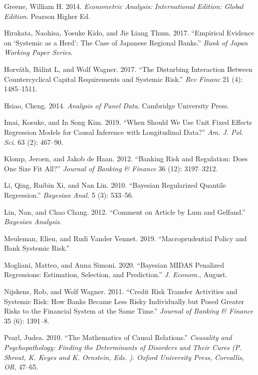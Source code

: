 \documentclass[
  10pt,
]{article}
\begin{document}
\leavevmode\hypertarget{ref-Greene2014}{}%
Greene, William H. 2014. \emph{Econometric Analysis: International
Edition: Global Edition}. Pearson Higher Ed.

\leavevmode\hypertarget{ref-Hirakata2017}{}%
Hirakata, Naohisa, Yosuke Kido, and Jie Liang Thum. 2017. ``Empirical
Evidence on `Systemic as a Herd': The Case of Japanese Regional Banks.''
\emph{Bank of Japan Working Paper Series}.

\leavevmode\hypertarget{ref-Horvath2017}{}%
Horváth, Bálint L, and Wolf Wagner. 2017. ``The Disturbing Interaction
Between Countercyclical Capital Requirements and Systemic Risk.''
\emph{Rev Financ} 21 (4): 1485--1511.

\leavevmode\hypertarget{ref-Hsiao2014}{}%
Hsiao, Cheng. 2014. \emph{Analysis of Panel Data}. Cambridge University
Press.

\leavevmode\hypertarget{ref-Imai2019}{}%
Imai, Kosuke, and In Song Kim. 2019. ``When Should We Use Unit Fixed
Effects Regression Models for Causal Inference with Longitudinal Data?''
\emph{Am. J. Pol. Sci.} 63 (2): 467--90.

\leavevmode\hypertarget{ref-Klomp2012}{}%
Klomp, Jeroen, and Jakob de Haan. 2012. ``Banking Risk and Regulation:
Does One Size Fit All?'' \emph{Journal of Banking \& Finance} 36 (12):
3197--3212.

\leavevmode\hypertarget{ref-Li2010}{}%
Li, Qing, Ruibin Xi, and Nan Lin. 2010. ``Bayesian Regularized Quantile
Regression.'' \emph{Bayesian Anal.} 5 (3): 533--56.

\leavevmode\hypertarget{ref-Lin2012}{}%
Lin, Nan, and Chao Chang. 2012. ``Comment on Article by Lum and
Gelfand.'' \emph{Bayesian Analysis}.

\leavevmode\hypertarget{ref-Meuleman2019}{}%
Meuleman, Elien, and Rudi Vander Vennet. 2019. ``Macroprudential Policy
and Bank Systemic Risk.''

\leavevmode\hypertarget{ref-Mogliani2020}{}%
Mogliani, Matteo, and Anna Simoni. 2020. ``Bayesian MIDAS Penalized
Regressions: Estimation, Selection, and Prediction.'' \emph{J. Econom.},
August.

\leavevmode\hypertarget{ref-Nijskens2011}{}%
Nijskens, Rob, and Wolf Wagner. 2011. ``Credit Risk Transfer Activities
and Systemic Risk: How Banks Became Less Risky Individually but Posed
Greater Risks to the Financial System at the Same Time.'' \emph{Journal
of Banking \& Finance} 35 (6): 1391--8.

\leavevmode\hypertarget{ref-Pearl2010}{}%
Pearl, Judea. 2010. ``The Mathematics of Causal Relations.''
\emph{Causality and Psychopathology: Finding the Determinants of
Disorders and Their Cures (P. Shrout, K. Keyes and K. Ornstein, Eds. ).
Oxford University Press, Corvallis, OR}, 47--65.
\end{document}
